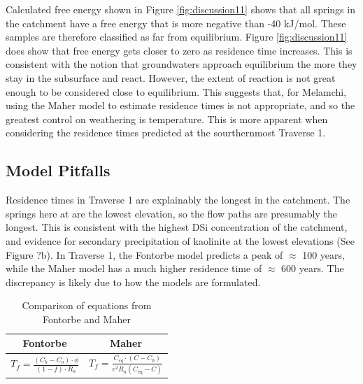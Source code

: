 \FloatBarrier

Calculated free energy shown in Figure \ref{fig:discussion11} shows that all springs in the catchment have a free energy that is more negative than -40 kJ/mol. These samples are therefore classified as far from equilibrium. Figure \ref{fig:discussion11} does show that free energy gets closer to zero as residence time increases. This is consistent with the notion that groundwaters approach equilibrium the more they stay in the subsurface and react. However, the extent of reaction is not great enough to be considered close to equilibrium. This suggests that, for Melamchi, using the Maher model to estimate residence times is not appropriate, and so the greatest control on weathering is temperature. This is more apparent when considering the residence times predicted at the sourthernmost Traverse 1.

\newpage

\subsection{Model Pitfalls}

Residence times in Traverse 1 are explainably the longest in the catchment. The springs here at are the lowest elevation, so the flow paths are presumably the longest. This is consistent with the highest DSi concentration of the catchment, and evidence for secondary precipitation of kaolinite at the lowest elevations (See Figure ?b). In Traverse 1, the Fontorbe model predicts a peak of $\approx$ 100 years, while the Maher model has a much higher residence time of $\approx$ 600 years. The discrepancy is likely due to how the models are formulated.

\begin{table}[h]
    \centering
    \renewcommand{\arraystretch}{2.2} %
    \begin{tabular}{cc}
        \toprule
        \textbf{Fontorbe} & \textbf{Maher} \\
        \midrule
        $\displaystyle T_f  = \frac{\left(C_h - C_o\right)\cdot\phi}{\left(1-f\right)\cdot R_n}$ & 
        $\displaystyle T_f = \frac{C_{eq} \cdot \left(C - C_0\right)}{e^2 R_n \left( C_{\text{eq}} - C \right)}$ \\ [10pt]
        \bottomrule
    \end{tabular}
    \caption{Comparison of equations from Fontorbe and Maher}
    \label{tab:equations}
\end{table}

